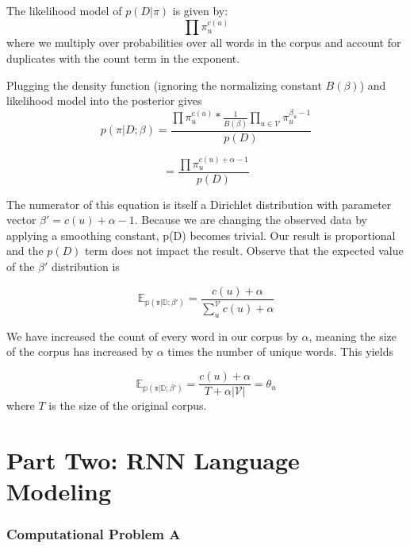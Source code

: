 The likelihood model of $p(D|\pi)$ is given by:
\begin{equation*}
    \prod \pi_u^{c(u)}
\end{equation*}
where we multiply over probabilities over all words in the corpus and account for duplicates with the count term in the exponent. 

Plugging the density function (ignoring the normalizing constant $B(\beta)$) and likelihood model into the posterior gives
\begin{equation*}
    p(\pi|D;\beta) = \frac{\prod \pi_u^{c(u)} * \frac{1}{B(\beta)}\prod_{u \in \mathcal{V}}\pi_u^{\beta_u - 1}}{p(D)}
\end{equation*}

\begin{equation*}
    = \frac{\prod \pi_u^{c(u) + \alpha - 1}}{p(D)}
\end{equation*}

The numerator of this equation is itself a Dirichlet distribution with parameter vector $\beta' = c(u) + \alpha -1$. Because we are changing the observed data by applying a smoothing constant, p(D) becomes trivial. Our result is proportional and the $p(D)$ term does not impact the result. Observe that the expected value of the $\beta'$ distribution is 

\begin{equation*}
    \mathbb{E_{p(\pi|D;\beta')}} = \frac{c(u) + \alpha}{\sum_u^{\mathcal{V}} c(u) + \alpha}
\end{equation*}

We have increased the count of every word in our corpus by $\alpha$, meaning the size of the corpus has increased by $\alpha$ times the number of unique words. This yields

\begin{equation*}
    \mathbb{E_{p(\pi|D;\beta')}} = \frac{c(u) + \alpha}{T + \alpha|\mathcal{V}|} = \theta_u
\end{equation*}
where $T$ is the size of the original corpus. 

\chapter*{Part Two: RNN Language Modeling}

\subsection*{Computational Problem A}

